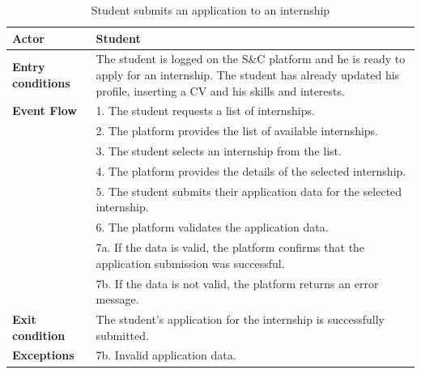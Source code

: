 \begin{table}[h!]
    \centering
    \begin{tabular}{lp{10cm}}
        \textbf{Actor} & Student \\ \hline
        \textbf{Entry conditions} & The student is logged on the S\&C platform and he is ready to apply for an internship. The student has already updated his profile, inserting a CV and his skills and interests.\\ \hline
        \textbf{Event Flow} &
        1. The student requests a list of internships. \\
        & 2. The platform provides the list of available internships. \\
        & 3. The student selects an internship from the list. \\
        & 4. The platform provides the details of the selected internship. \\
        & 5. The student submits their application data for the selected internship. \\
        & 6. The platform validates the application data. \\
        & 7a. If the data is valid, the platform confirms that the application submission was successful. \\
        & 7b. If the data is not valid, the platform returns an error message. \\
        \hline
        \textbf{Exit condition} & The student's application for the internship is successfully submitted. \\ \hline
        \textbf{Exceptions} &
        7b. Invalid application data. \\
    \end{tabular}
    \caption{ Student submits an application to an internship}
    \label{tab:internship_application}
\end{table}



